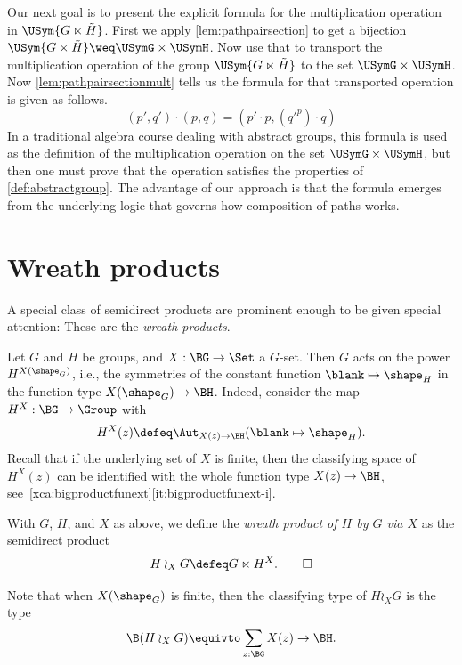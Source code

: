Our next goal is to present the explicit formula for the multiplication operation in $\USym { G \ltimes \tilde H }$.
First we apply \cref{lem:pathpairsection} to get a bijection $\USym { G \ltimes \tilde H } \weq \USymG \times \USymH$.
Now use that to transport the multiplication operation of the group $\USym { G \ltimes \tilde H }$ to the set $\USymG \times \USymH$.
Now \cref{lem:pathpairsectionmult} tells us the formula for that transported operation is given as follows.
$$ (p',q') \cdot (p,q) = (p' \cdot p , ({q'} ^ p) \cdot q) $$
In a traditional algebra course dealing with abstract groups, this formula is used as the definition of the multiplication operation
on the set $\USymG \times \USymH$, but then one must prove that the operation satisfies the properties of \cref{def:abstractgroup}.
The advantage of our approach is that the formula emerges from the underlying logic that governs how composition of paths works.


\section{Wreath products}
\label{sec:wreath}

A special class of semidirect products are prominent enough to be given special attention: These are the \emph{wreath products}.

Let $G$ and $H$ be groups, and $X : \BG \to \Set$ a $G$-set.  Then $G$ acts on the power $H^{X(\sh_G)}$, i.e., the symmetries of the constant
function $\blank \mapsto \sh_H$ in the function type $X(\sh_G) \to \BH$.
Indeed, consider the map $H^X : \BG \to \Group$ with
\[
  H^X(z) \defeq \Aut_{X(z) \to \BH}(\blank \mapsto \sh_H).
\]
Recall that if the underlying set of $X$ is finite,
then the classifying space of $H^X(z)$ can be identified with
the whole function type $X(z) \to \BH$,
see~\cref{xca:bigproductfunext}\ref{it:bigproductfunext-i}.
\begin{definition}
  With $G$, $H$, and $X$ as above, we define the \emph{wreath product of $H$ by $G$ via $X$} as the semidirect product
  \[
    H \wr_X G \defeq G \ltimes H^X.\qedhere
  \]
\end{definition}
Note that when $X(\sh_G)$ is finite, then
the classifying type of $H \wr_X G$ is the type
\[
  \B(H \wr_X G) \equivto \sum_{z:\BG}X(z) \to \BH.
\]

\begin{example}
  
\end{example}

